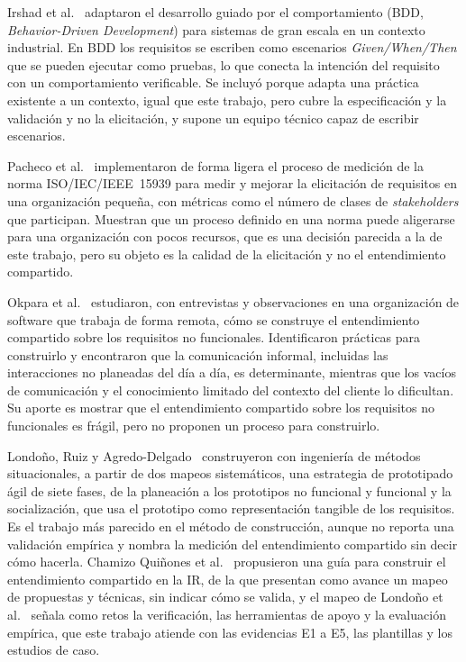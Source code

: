 \documentclass[12pt,letterpaper,oneside]{report}
\begin{document}
Irshad et al.~\cite{irshad2021bdd} adaptaron el desarrollo guiado por el
comportamiento (BDD, \textit{Behavior-Driven Development}) para sistemas de gran
escala en un contexto industrial. En BDD los requisitos se escriben como
escenarios \textit{Given/When/Then} que se pueden ejecutar como pruebas, lo que
conecta la intención del requisito con un comportamiento verificable. Se incluyó porque adapta una práctica existente a un contexto, igual que este trabajo, pero cubre la especificación y la validación y no la elicitación, y supone un
equipo técnico capaz de escribir escenarios.

Pacheco et al.~\cite{pacheco2022} implementaron de forma ligera el proceso de
medición de la norma ISO/IEC/IEEE~15939 para medir y mejorar la elicitación de
requisitos en una organización pequeña, con métricas como el número de clases de
\textit{stakeholders} que participan. Muestran que un proceso definido en una
norma puede aligerarse para una organización con pocos recursos, que es una
decisión parecida a la de este trabajo, pero su objeto es la calidad de la
elicitación y no el entendimiento compartido.

Okpara et al.~\cite{okpara2023} estudiaron, con entrevistas y observaciones en
una organización de software que trabaja de forma remota, cómo se construye el
entendimiento compartido sobre los requisitos no funcionales. Identificaron
prácticas para construirlo y encontraron que la comunicación informal, incluidas
las interacciones no planeadas del día a día, es determinante, mientras que los
vacíos de comunicación y el conocimiento limitado del contexto del cliente lo
dificultan. Su aporte es mostrar que el entendimiento compartido sobre los requisitos no
funcionales es frágil, pero no proponen un proceso para construirlo.

Londoño, Ruiz y Agredo-Delgado~\cite{londono2023prototyping} construyeron con
ingeniería de métodos situacionales, a partir de dos mapeos sistemáticos, una
estrategia de prototipado ágil de siete fases, de la planeación a los
prototipos no funcional y funcional y la socialización, que usa el prototipo
como representación tangible de los requisitos. Es el trabajo más parecido en
el método de construcción, aunque no reporta una validación empírica y nombra la
medición del entendimiento compartido sin decir cómo hacerla. Chamizo
Quiñones et al.~\cite{chamizo2025guide} propusieron una guía para construir el
entendimiento compartido en la IR, de la que presentan como avance un mapeo de
propuestas y técnicas, sin indicar cómo se valida, y el mapeo de Londoño et
al.~\cite{londono2026mapping} señala como retos la verificación, las
herramientas de apoyo y la evaluación empírica, que este trabajo atiende con
las evidencias E1 a E5, las plantillas y los estudios de caso.
\end{document}
